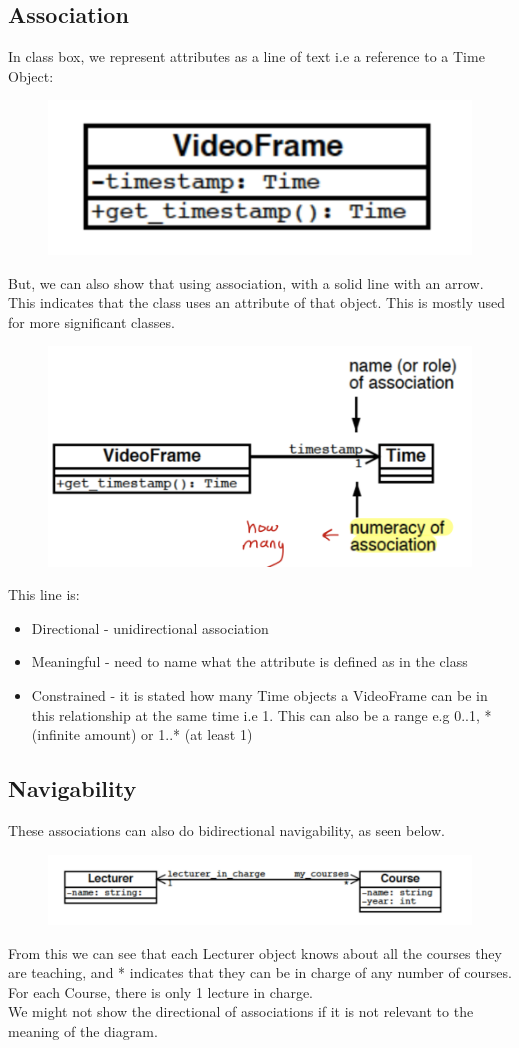 \documentclass{article}
\begin{document}
\subsection{Association}
In class box, we represent attributes as a line of text i.e a reference to a Time Object:
\begin{figure}[H]
\centering
\includegraphics[width = 0.3\linewidth]{Pictures/Screenshot 2023-01-27 at 12.18.38.png}
\end{figure}
But, we can also show that using association, with a solid line with an arrow. This indicates that the class uses an attribute of that object. This is mostly used for more significant classes.
\begin{figure}[H]
\centering
\includegraphics[width = 0.6\linewidth]{Pictures/Screenshot 2023-01-27 at 12.20.22.png}
\end{figure}
This line is:
\begin{itemize}
    \item Directional - unidirectional association
    \item Meaningful - need to name what the attribute is defined as in the class
    \item Constrained - it is stated how many Time objects a VideoFrame can be in this relationship at the same time i.e 1. This can also be a range e.g 0..1, * (infinite amount) or 1..* (at least 1)
\end{itemize}
\subsection{Navigability}
These associations can also do bidirectional navigability, as seen below.
\begin{figure}[H]
\centering
\includegraphics[width = 0.6\linewidth]{Pictures/Screenshot 2023-01-27 at 12.23.32.png}
\end{figure}
From this we can see that each Lecturer object knows about all the courses they are teaching, and * indicates that they can be in charge of any number of courses. For each Course, there is only 1 lecture in charge. \\
We might not show the directional of associations if it is not relevant to the meaning of the diagram.
\end{document}
